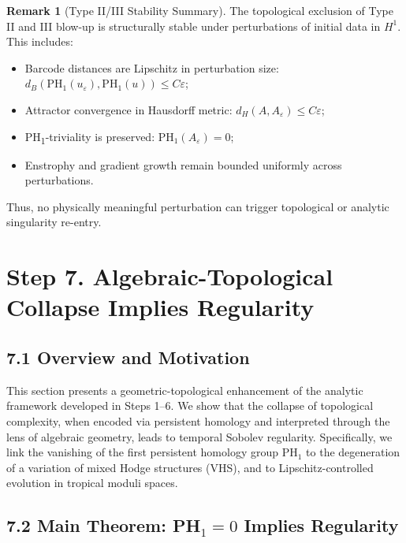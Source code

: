 \documentclass[11pt]{article}
\theoremstyle{definition}
\newtheorem{remark}[theorem]{Remark}
\begin{document}
\begin{remark}[Type II/III Stability Summary]
The topological exclusion of Type II and III blow-up is structurally stable under perturbations of initial data in $H^1$. This includes:
\begin{itemize}
    \item Barcode distances are Lipschitz in perturbation size: $d_B(\mathrm{PH}_1(u_\varepsilon), \mathrm{PH}_1(u)) \le C \varepsilon$;
    \item Attractor convergence in Hausdorff metric: $d_H(A, A_\varepsilon) \le C \varepsilon$;
    \item PH\textsubscript{1}-triviality is preserved: $\mathrm{PH}_1(A_\varepsilon) = 0$;
    \item Enstrophy and gradient growth remain bounded uniformly across perturbations.
\end{itemize}
Thus, no physically meaningful perturbation can trigger topological or analytic singularity re-entry.
\end{remark}



\section*{Step 7. Algebraic-Topological Collapse Implies Regularity}

\subsection*{7.1 Overview and Motivation}

This section presents a geometric-topological enhancement of the analytic framework developed in Steps 1–6. We show that the collapse of topological complexity, when encoded via persistent homology and interpreted through the lens of algebraic geometry, leads to temporal Sobolev regularity. Specifically, we link the vanishing of the first persistent homology group $\mathrm{PH}_1$ to the degeneration of a variation of mixed Hodge structures (VHS), and to Lipschitz-controlled evolution in tropical moduli spaces.

\subsection*{7.2 Main Theorem: PH$_1 = 0$ Implies Regularity}
\end{document}
